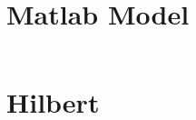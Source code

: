 \appendix

\chapter{Matlab Model}
\label{app:matlabmodel}
\inputminted[linenos, breaklines, bgcolor=lightgray]{matlab}{../Matlab/IFsine/HilbertTest.m}

\chapter{Hilbert}
\label{app:hilbert}
\inputminted[linenos, breaklines, bgcolor=lightgray]{matlab}{../Matlab/IFsine/getIF.m}